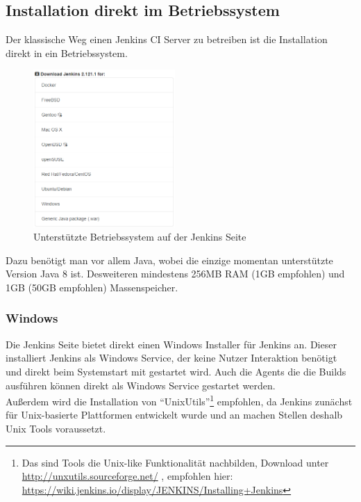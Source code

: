 \subsection{Installation direkt im Betriebssystem}
Der klassische Weg einen Jenkins CI Server zu betreiben ist die Installation direkt in ein Betriebssystem.
\begin{figure}
  \begin{center}
    \includegraphics[width=0.48\textwidth]{./Images/Jenkins_installation_and_setup.png}
  \end{center}
  \caption{Unterstützte Betriebssystem auf der Jenkins Seite\cite{jenkins-download}}\label{Jenkins_installation_and_setup}
\end{figure}
Dazu benötigt man vor allem Java, wobei die einzige momentan unterstützte Version Java 8 ist.\cite{jenkins-java} Desweiteren mindestens 256MB RAM (1GB empfohlen) und 1GB (50GB empfohlen) Massenspeicher.\cite{jenkins-installing}
\subsubsection*{Windows}
Die Jenkins Seite bietet direkt einen Windows Installer für Jenkins an. Dieser installiert Jenkins als Windows Service, der keine Nutzer Interaktion benötigt und direkt beim Systemstart mit gestartet wird. Auch die Agents die die Builds ausführen können direkt als Windows Service gestartet werden. \cite{jenkins-windows}\\
Außerdem wird die Installation von "`UnixUtils"'\footnote{Das sind Tools die Unix-like Funktionalität nachbilden, Download unter \url{http://unxutils.sourceforge.net/} , empfohlen hier: \url{https://wiki.jenkins.io/display/JENKINS/Installing+Jenkins}} empfohlen, da Jenkins zunächst für Unix-basierte Plattformen entwickelt wurde und an machen Stellen deshalb Unix Tools voraussetzt. 
